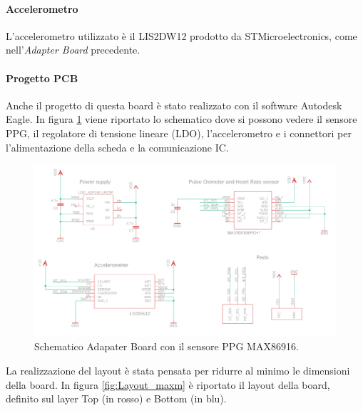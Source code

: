 \paragraph{Accelerometro} L'accelerometro utilizzato è il LIS2DW12 prodotto da STMicroelectronics, come nell'\textit{Adapter Board} precedente.
\pagebreak

\paragraph{Progetto PCB} Anche il progetto di questa board è stato realizzato con il software Autodesk Eagle. In figura \ref{fig:schematic_max} viene riportato lo schematico dove si possono vedere il sensore PPG, il regolatore di tensione lineare (LDO), l'accelerometro e i connettori per l'alimentazione della scheda e la comunicazione IC.
\begin{figure}[b]
	\centering
	\includegraphics[width=0.8\linewidth]{ImageFiles/Hardware/schematic_max}
	\caption{Schematico Adapater Board con il sensore PPG MAX86916.}
	\label{fig:schematic_max}
\end{figure}
La realizzazione del layout è stata pensata per ridurre al minimo le dimensioni della board. In figura \ref{fig:Layout_maxm} è riportato il layout della board, definito sul layer Top (in rosso) e Bottom (in blu).
